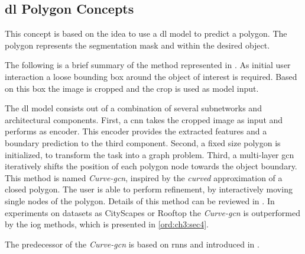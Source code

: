\subsection{\gls{dl} Polygon Concepts}\label{ord:ch2:sec3:subsec3}
This concept is based on the idea to use a \gls{dl} model to predict a polygon.
The polygon represents the segmentation mask and within the desired object.

The following is a brief summary of the method represented in \cite{Ling19-Curve-GCN}.
As initial user interaction a loose bounding box around the object of interest is required.
Based on this box the image is cropped and the crop is used as model input.

The \gls{dl} model consists out of a combination of several subnetworks and architectural components.
First, a \gls{cnn} takes the cropped image as input and performs as encoder.
This encoder provides the extracted features and a boundary prediction to the third component.
Second, a fixed size polygon is initialized, to transform the task into a graph problem.
Third, a multi-layer \gls{gcn} iteratively shifts the position of each polygon node towards the object boundary. 
This method is named \textit{Curve-\gls{gcn}}, inspired by the \textit{curved} approximation of a closed polygon.
The user is able to perform refinement, by interactively moving single nodes of the polygon.
Details of this method can be reviewed in \cite{Ling19-Curve-GCN}.
In experiments on datasets as CityScapes or Rooftop the \textit{Curve-\gls{gcn}} is outperformed by the \gls{iog} methods, which is presented in \ref{ord:ch3:sec4}.

The predecessor of the \textit{Curve-\gls{gcn}} is based on \glspl{rnn} and introduced in \cite{Acu18-Polygon-RNN++}.





